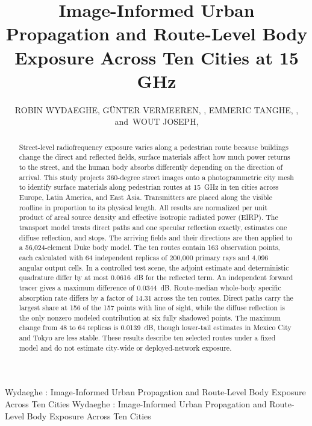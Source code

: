 \documentclass{ieeeaccess}
\begin{document}
\history{}
\doi{}

\title{Image-Informed Urban Propagation and Route-Level Body Exposure Across Ten Cities at 15 GHz}

\author{\uppercase{Robin Wydaeghe},
\uppercase{G\"unter Vermeeren}, ,
\uppercase{Emmeric Tanghe}, ,
and~\uppercase{Wout Joseph}, }

\address[1]{Department of Information Technology, Ghent University/IMEC,
9052 Ghent, Belgium (e-mail: robin.wydaeghe@ugent.be)}

\markboth
{Wydaeghe \headeretal: Image-Informed Urban Propagation and Route-Level Body Exposure Across Ten Cities}
{Wydaeghe \headeretal: Image-Informed Urban Propagation and Route-Level Body Exposure Across Ten Cities}


\begin{abstract}
Street-level radiofrequency exposure varies along a pedestrian route because
buildings change the direct and reflected fields, surface materials affect how
much power returns to the street, and the human body absorbs differently
depending on the direction of arrival. This study projects 360-degree street
images onto a photogrammetric city mesh to identify surface materials along
pedestrian routes at 15~GHz in ten cities across Europe, Latin America, and
East Asia. Transmitters are placed along the visible roofline in proportion to
its physical length. All results are normalized per unit product of areal source
density and effective isotropic radiated power (EIRP). The transport model
treats direct paths and one specular reflection exactly, estimates one diffuse
reflection, and stops. The arriving fields and their directions are then applied
to a 56,024-element Duke body model. The ten routes contain 163 observation
points, each calculated with 64 independent replicas of 200,000 primary rays
and 4,096 angular output cells. In a controlled test scene, the adjoint
estimate and deterministic quadrature differ by at most 0.0616~dB for the
reflected term. An independent forward tracer gives a maximum difference of
0.0344~dB. Route-median whole-body specific absorption rate differs by a factor
of 14.31 across the ten routes. Direct paths carry the largest share at 156 of
the 157 points with line of sight, while the diffuse reflection is the only nonzero
modeled contribution at six fully shadowed points. The maximum change from 48 to
64 replicas is 0.0139~dB, though lower-tail estimates in Mexico City and Tokyo
are less stable. These results describe ten selected routes under a fixed model
and do not estimate city-wide or deployed-network exposure.
\end{abstract}
\end{document}
